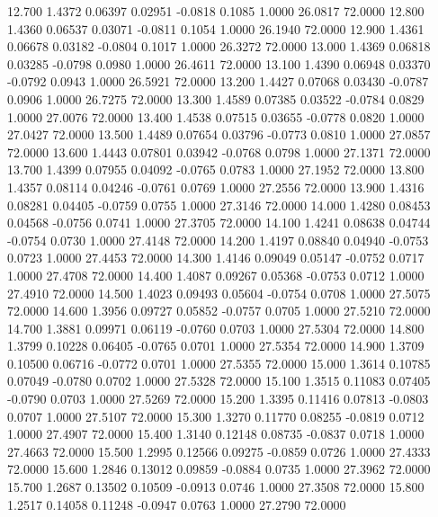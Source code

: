   12.700   1.4372   0.06397   0.02951  -0.0818   0.1085   1.0000  26.0817  72.0000
  12.800   1.4360   0.06537   0.03071  -0.0811   0.1054   1.0000  26.1940  72.0000
  12.900   1.4361   0.06678   0.03182  -0.0804   0.1017   1.0000  26.3272  72.0000
  13.000   1.4369   0.06818   0.03285  -0.0798   0.0980   1.0000  26.4611  72.0000
  13.100   1.4390   0.06948   0.03370  -0.0792   0.0943   1.0000  26.5921  72.0000
  13.200   1.4427   0.07068   0.03430  -0.0787   0.0906   1.0000  26.7275  72.0000
  13.300   1.4589   0.07385   0.03522  -0.0784   0.0829   1.0000  27.0076  72.0000
  13.400   1.4538   0.07515   0.03655  -0.0778   0.0820   1.0000  27.0427  72.0000
  13.500   1.4489   0.07654   0.03796  -0.0773   0.0810   1.0000  27.0857  72.0000
  13.600   1.4443   0.07801   0.03942  -0.0768   0.0798   1.0000  27.1371  72.0000
  13.700   1.4399   0.07955   0.04092  -0.0765   0.0783   1.0000  27.1952  72.0000
  13.800   1.4357   0.08114   0.04246  -0.0761   0.0769   1.0000  27.2556  72.0000
  13.900   1.4316   0.08281   0.04405  -0.0759   0.0755   1.0000  27.3146  72.0000
  14.000   1.4280   0.08453   0.04568  -0.0756   0.0741   1.0000  27.3705  72.0000
  14.100   1.4241   0.08638   0.04744  -0.0754   0.0730   1.0000  27.4148  72.0000
  14.200   1.4197   0.08840   0.04940  -0.0753   0.0723   1.0000  27.4453  72.0000
  14.300   1.4146   0.09049   0.05147  -0.0752   0.0717   1.0000  27.4708  72.0000
  14.400   1.4087   0.09267   0.05368  -0.0753   0.0712   1.0000  27.4910  72.0000
  14.500   1.4023   0.09493   0.05604  -0.0754   0.0708   1.0000  27.5075  72.0000
  14.600   1.3956   0.09727   0.05852  -0.0757   0.0705   1.0000  27.5210  72.0000
  14.700   1.3881   0.09971   0.06119  -0.0760   0.0703   1.0000  27.5304  72.0000
  14.800   1.3799   0.10228   0.06405  -0.0765   0.0701   1.0000  27.5354  72.0000
  14.900   1.3709   0.10500   0.06716  -0.0772   0.0701   1.0000  27.5355  72.0000
  15.000   1.3614   0.10785   0.07049  -0.0780   0.0702   1.0000  27.5328  72.0000
  15.100   1.3515   0.11083   0.07405  -0.0790   0.0703   1.0000  27.5269  72.0000
  15.200   1.3395   0.11416   0.07813  -0.0803   0.0707   1.0000  27.5107  72.0000
  15.300   1.3270   0.11770   0.08255  -0.0819   0.0712   1.0000  27.4907  72.0000
  15.400   1.3140   0.12148   0.08735  -0.0837   0.0718   1.0000  27.4663  72.0000
  15.500   1.2995   0.12566   0.09275  -0.0859   0.0726   1.0000  27.4333  72.0000
  15.600   1.2846   0.13012   0.09859  -0.0884   0.0735   1.0000  27.3962  72.0000
  15.700   1.2687   0.13502   0.10509  -0.0913   0.0746   1.0000  27.3508  72.0000
  15.800   1.2517   0.14058   0.11248  -0.0947   0.0763   1.0000  27.2790  72.0000
